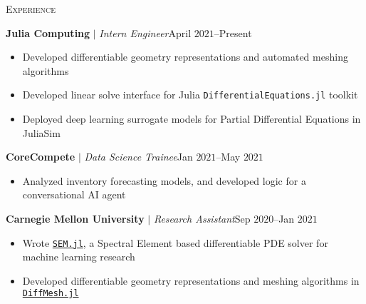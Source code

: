 \documentclass[10pt]{article}
\begin{document}
\begin{multicols}{2}
\textsc{Experience}
\columnbreak

\textbf{Julia Computing} $|$ \textit{Intern Engineer}\hfill April $2021$--Present

\vspace{-1.75em}
\begin{itemize}[label=-,leftmargin=1.0em]
    \setlength\itemsep{-0.25em}
    \item Developed differentiable geometry representations and automated meshing algorithms
    \item Developed linear solve interface for Julia \texttt{DifferentialEquations.jl} toolkit
    \item Deployed deep learning surrogate models for Partial Differential Equations in JuliaSim
\end{itemize}
\vspace{-2.0em}

\vspace{0.5em}
%
\textbf{CoreCompete} $|$ \textit{Data Science Trainee}\hfill Jan $2021$--May $2021$

\vspace{-1.75em}
\begin{itemize}[label=-,leftmargin=1.0em]
    \setlength\itemsep{-0.25em}
    \item Analyzed inventory forecasting models, and developed logic for a conversational AI agent
\end{itemize}
\vspace{-2.0em}

\vspace{0.5em}
%
\textbf{Carnegie Mellon University} $|$ \textit{Research Assistant}\hfill Sep $2020$--Jan $2021$

\vspace{-1.75em}
\begin{itemize}[label=-,leftmargin=1.0em]
    \setlength\itemsep{-0.25em}
    \item Wrote \href{https://github.com/vpuri3/SEM.jl}{\texttt{SEM.jl}}, a Spectral Element based differentiable PDE solver for machine learning research
    \item Developed differentiable geometry representations and meshing algorithms in \href{https://github.com/vpuri3/DiffMesh.jl}{\texttt{DiffMesh.jl}}
\end{itemize}
\vspace{-2.0em}


\end{multicols}
\end{document}
